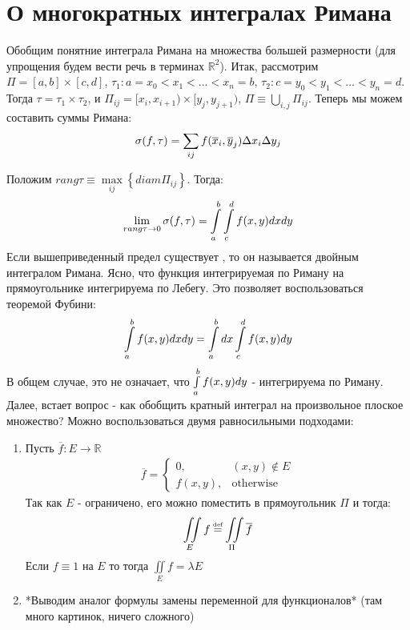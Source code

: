 \section{О многократных интегралах Римана}

Обобщим понятние интеграла Римана на множества большей размерности 
(для упрощения будем вести речь в терминах $\mathbb{R}^2$).
Итак, рассмотрим $\Pi = [a, b] \times [c, d]$, $\tau_1 : a = x_0 < x_1 < \dots < x_n = b$, 
$\tau_2 : c = y_0 < y_1 < \dots < y_n = d$. 
Тогда $\tau = \tau_1 \times \tau_2$, и 
$\Pi_{ij} = [x_i, x_{i + 1}) \times [y_j, y_{j + 1})$, $\Pi \equiv \bigcup\limits_{i, j} \Pi_{ij}$.
Теперь мы можем составить суммы Римана:
\begin{gather*}
	\sigma(f, \tau) = \sum\limits_{ij} f(\overline{x}_i, \overline{y}_j)\Delta x_i	\Delta y_j
\end{gather*}

Положим $rang\tau \equiv \max\limits_{ij}\left\{ diam \Pi_{ij}\right\}$.
Тогда:
\begin{gather*}
	\lim\limits_{rang\tau\rightarrow 0} \sigma(f, \tau) = \int\limits_{a}^{b}\int\limits_{c}^{d}f(x, y)dxdy
\end{gather*}
Если вышеприведенный предел существует , то он называется двойным интегралом Римана. 
Ясно, что функция интегрируемая по Риману на прямоугольнике интегрируема по Лебегу. 
Это позволяет воспользоваться теоремой Фубини:
\begin{gather*}
	\int\limits_{a}^{b}f(x, y)dxdy = \int\limits_{a}^{b}dx\int\limits_{c}^{d}f(x, y)dy
\end{gather*}
В общем случае, это не означает, что $\int\limits_{a}^{b}f(x, y)dy$ - интегрируема по Риману.
Далее, встает вопрос - как обобщить кратный интеграл на произвольное плоское множество?
Можно воспользоваться двумя равносильными подходами:
\begin{enumerate}
	\item 
		Пусть $\overline{f}: E \rightarrow \mathbb{R}$
		\begin{gather*}
			\overline{f} =  \left\{\begin{matrix}
				0,& (x, y) \notin E
									\\ 
										f(x, y), &\text{otherwise}
									\end{matrix}\right.
		\end{gather*}
		Так как $E$ - ограничено, его можно поместить в прямоугольник $\Pi$ и тогда:
		\begin{gather*}
			\iint\limits_{E}f \defeq \iint\limits_{\Pi} \overline{f}
		\end{gather*}
		Если $f \equiv 1$ на $E$ то тогда
		$\iint\limits_{E}f = \lambda E$
	\item
		*Выводим аналог формулы замены переменной для функционалов* \todo (там много картинок, ничего
		сложного)
\end{enumerate}

